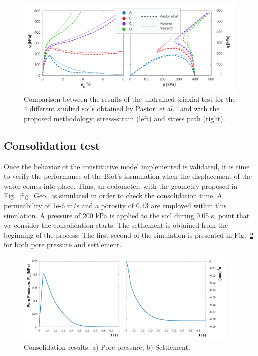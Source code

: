 \documentclass[preprint,12pt,a4paper]{elsarticle}
\begin{document}
\begin{figure}
\centering
\includegraphics[width=0.99\textwidth]{Figs/undrained.pdf}
\caption{Comparison between the results of the undrained triaxial test for the 4 different studied soils obtained by Pastor~\textit{et al.}~\cite{PastorZC:90} and with the proposed methodology: stress-strain (left) and stress path (right).}
\label{fig_undrained}
\end{figure}


\subsection{Consolidation test}
\label{sec:32}
Once the behavior of the constitutive model implemented is validated, it is time to verify the performance of the Biot's formulation when the displacement of the water comes into place. Thus, an oedometer, with the geometry proposed in Fig.~\ref{fig_Geo}, is simulated in order to check the consolidation time. A permeability of 1e-6 m/s and a porosity of 0.43 are employed within this simulation. A pressure of 200 kPa is applied to the soil during 0.05 s, point that we consider the consolidation starts. The settlement is obtained from the beginning of the process. The first second of the simulation is presented in Fig.~\ref{fig_conso} for both pore pressure and settlement.


\begin{figure}
\centering
\includegraphics[width=0.95\textwidth]{Figs/conso.pdf}
\caption{Consolidation results: a) Pore pressure, b) Settlement.}
\label{fig_conso}
\end{figure}
\end{document}
